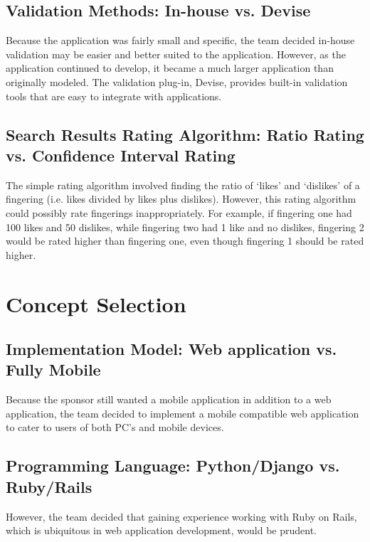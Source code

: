 \documentclass[12pt,english]{article}
\begin{document}
\subsection{Validation Methods: In-house vs. Devise}

Because the application was fairly small and specific, the team decided
in-house validation may be easier and better suited to the application.
However, as the application continued to develop, it became a much
larger application than originally modeled. The validation plug-in,
Devise, provides built-in validation tools that are easy to integrate
with applications.


\subsection{Search Results Rating Algorithm: Ratio Rating vs. Confidence Interval
Rating}

The simple rating algorithm involved finding the ratio of `likes'
and `dislikes' of a fingering (i.e. likes divided by likes plus dislikes).
However, this rating algorithm could possibly rate fingerings inappropriately.
For example, if fingering one had 100 likes and 50 dislikes, while
fingering two had 1 like and no dislikes, fingering 2 would be rated
higher than fingering one, even though fingering 1 should be rated
higher.


\section{Concept Selection}


\subsection{Implementation Model: Web application vs. Fully Mobile}

Because the sponsor still wanted a mobile application in addition
to a web application, the team decided to implement a mobile compatible
web application to cater to users of both PC's and mobile devices.


\subsection{Programming Language: Python/Django vs. Ruby/Rails}

However, the team decided that gaining experience working with Ruby
on Rails, which is ubiquitous in web application development, would
be prudent.
\end{document}
